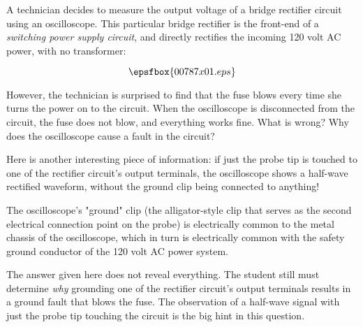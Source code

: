 

A technician decides to measure the output voltage of a bridge rectifier circuit using an oscilloscope.  This particular bridge rectifier is the front-end of a {\it switching power supply circuit}, and directly rectifies the incoming 120 volt AC power, with no transformer:

$$\epsfbox{00787x01.eps}$$

However, the technician is surprised to find that the fuse blows every time she turns the power on to the circuit.  When the oscilloscope is disconnected from the circuit, the fuse does not blow, and everything works fine.  What is wrong?  Why does the oscilloscope cause a fault in the circuit?

Here is another interesting piece of information: if just the probe tip is touched to one of the rectifier circuit's output terminals, the oscilloscope shows a half-wave rectified waveform, without the ground clip being connected to anything!







The oscilloscope's "ground" clip (the alligator-style clip that serves as the second electrical connection point on the probe) is electrically common to the metal chassis of the oscilloscope, which in turn is electrically common with the safety ground conductor of the 120 volt AC power system.







The answer given here does not reveal everything.  The student still must determine {\it why} grounding one of the rectifier circuit's output terminals results in a ground fault that blows the fuse.  The observation of a half-wave signal with just the probe tip touching the circuit is the big hint in this question.




